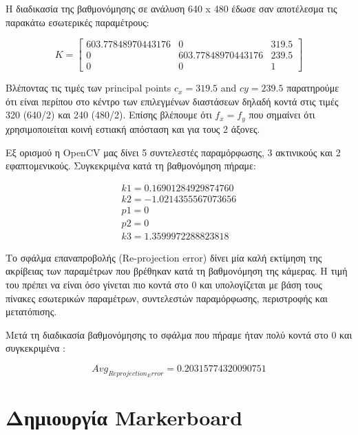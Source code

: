 Η διαδικασία της βαθμονόμησης σε ανάλυση 640 x 480 έδωσε σαν αποτέλεσμα τις παρακάτω εσωτερικές παραμέτρους:


\begin{equation}
K=
\begin{bmatrix}
603.77848970443176 & 0 & 319.5\\
0 & 603.77848970443176 & 239.5\\
0 & 0 & 1
\end{bmatrix}
\end{equation}

Βλέποντας τις τιμές των principal points $c_{x}=319.5$ and $c{y}=239.5$ παρατηρούμε ότι είναι περίπου στο κέντρο των επιλεγμένων διαστάσεων δηλαδή κοντά στις τιμές  320 (640/2) και 240 (480/2). Επίσης βλέπουμε ότι $f_{x}=f_{y}$ που σημαίνει ότι χρησιμοποιείται κοινή εστιακή απόσταση και για τους 2 άξονες.


Εξ ορισμού η OpenCV μας δίνει 5 συντελεστές παραμόρφωσης, 3 ακτινικούς και 2 εφαπτομενικούς. Συγκεκριμένα κατά τη βαθμονόμηση πήραμε:

\begin{equation}
\begin{aligned}
k1= 0.16901284929874760\\
k2= -1.0214355567073656\\
p1= 0\\
p2= 0\\
k3= 1.3599972288823818 
\end{aligned}
\end{equation}

Το σφάλμα επαναπροβολής (Re-projection error) δίνει μία καλή εκτίμηση της ακρίβειας των παραμέτρων που βρέθηκαν κατά τη βαθμονόμηση της κάμερας. Η τιμή του πρέπει να είναι όσο γίνεται πιο κοντά στο 0 και υπολογίζεται με βάση τους πίνακες εσωτερικών παραμέτρων, συντελεστών παραμόρφωσης, περιστροφής και μετατόπισης. 


Μετά τη διαδικασία βαθμονόμησης το σφάλμα που πήραμε ήταν πολύ κοντά στο 0 και συγκεκριμένα :

\begin{equation}
Avg_{Reprojection_Error} = 0.20315774320090751
\end{equation}


\section{Δημιουργία Markerboard}


